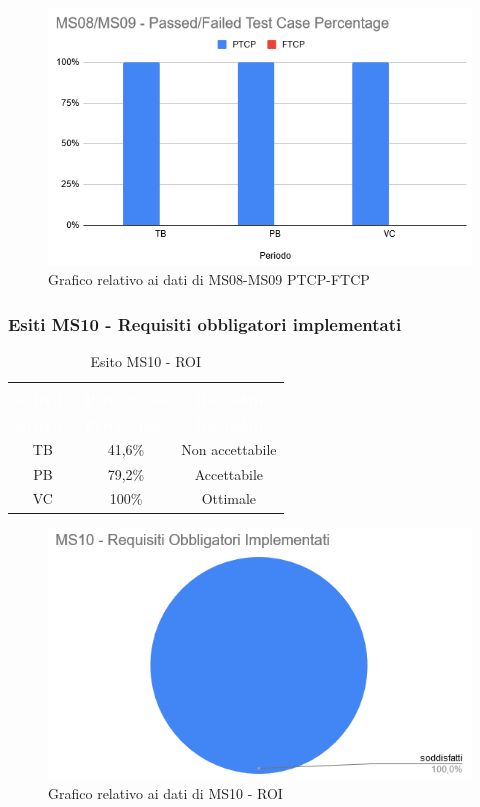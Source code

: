 \begin{figure}[H]
\centering
\includegraphics[scale=0.7]{./img/MS08-MS09.png}
\caption{Grafico relativo ai dati di MS08-MS09 PTCP-FTCP}
\end{figure}

\subsubsection{Esiti MS10 - Requisiti obbligatori implementati}
\begin{longtable}{c c c}
\rowcolor{white}\caption{Esito MS10 - ROI} \\
	\rowcolor{redafk}
\textcolor{white}{\textbf{Attività}} &
\textcolor{white}{\textbf{Percentuale}} & 
\textcolor{white}{\textbf{Riscontro}} \\
	\endfirsthead
\textcolor{white}{\textbf{Attività}} &
\textcolor{white}{\textbf{Percentuale}} & 
\textcolor{white}{\textbf{Riscontro}} \\
	\endhead
	TB & 41,6\% & Non accettabile\\
	PB & 79,2\% & Accettabile\\
	VC & 100\% & Ottimale\\
\end{longtable}

\begin{figure}[H]
\centering
\includegraphics[scale=0.7]{./img/MS10.png}
\caption{Grafico relativo ai dati di MS10 - ROI}
\end{figure}


